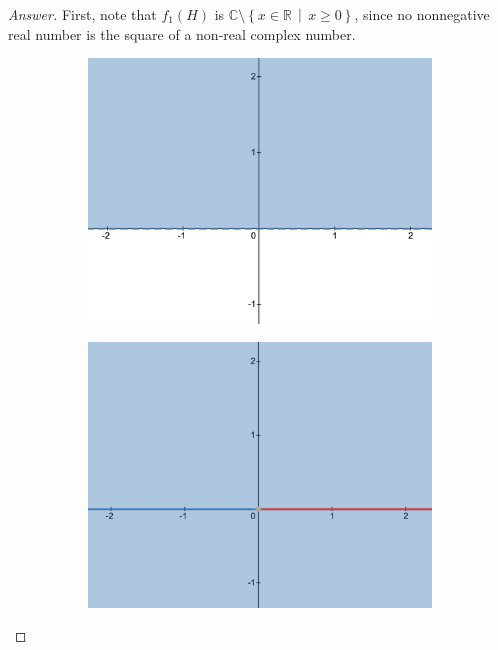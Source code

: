 \documentclass[12pt]{article}
\newcommand{\cx}{\mathbb{C}}
\newcommand{\real}{\mathbb{R}}
\newcommand\setb[1]{\left \{ #1 \right \}}
\theoremstyle{definition}
\begin{document}
\begin{proof}[Answer]
    First, note that $f_1(H)$ is $\cx \setminus \setb{ x \in \real \, \middle| \, x \geq 0 }$, since no nonnegative real number is the square of a non-real complex number. 
    \begin{figure}[H]
        \begin{subfigure}{0.45\textwidth}
            \centering
            \includegraphics[width=\textwidth]{13a.png}
            \label{fig:13a}
        \end{subfigure}
        \hfill
        \begin{subfigure}{0.45\textwidth}
            \centering
            \includegraphics[width=\textwidth]{13b.png}

\end{subfigure}
\end{figure}
\end{proof}
\end{document}
